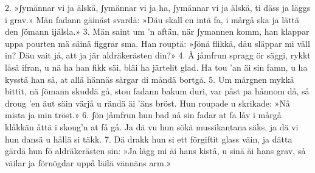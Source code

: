 2.  »ʃymännar vi ja älskä, ʃymännar vi ja ha,
    ʃymännar vi ja älskä, ti däss ja läggs i grav.»
    Män fadann gäinäst svardä: »Däu skall en intä fa,
    i mårgå ska ja lättä den ʃömann ijälsla.»
3.  Män saint um ’n aftän, när ʃymannen komm,
    han klappar uppa pourten mä säinä figgrar sma.
    Han rouptä: »ʃönä flikkä, däu släppar mi väll in?
    Däu vait jå, att ja jär aldräkerästen din?»
4.  Å jåmfrun spragg ör säggi, rykkt låsä ifran,
    u nä ha han fikk säi, bläi ha järtelit glad.
    Ha tou ’an äi sin famn, u ha kysstä han så,
    at allä hännäs sårgar di måndä bortgå.
5.  Um mårgnen mykkä bittit, nä ʃömann skuddä gå,
    stou fadann bakum duri, var påst pa hånnom då,
    så droug ’en äut säin värjå u rändä äi ’äns bröst.
    Hun roupade u skrikade: »Nå mista ja min tröst.»
6.  ʃön jåmfrun hun bad nå sin fadar at fa låv
    i mårgå klåkkän åttä i skoug’n at få gå.
    Ja dä vu hun sökä mussikantana säks,
    ja dä vi hun dansä u hållä si täkk.
7.  Dä drakk hun si ett förgiftit glass väin,
    ja dätta gärdä hun fö aldräkerästen sin:
    »Ja lägg mi äi hans kistå, u sinä äi hans grav,
    så väilar ja förnögdar uppå läilä vännäns arm.»